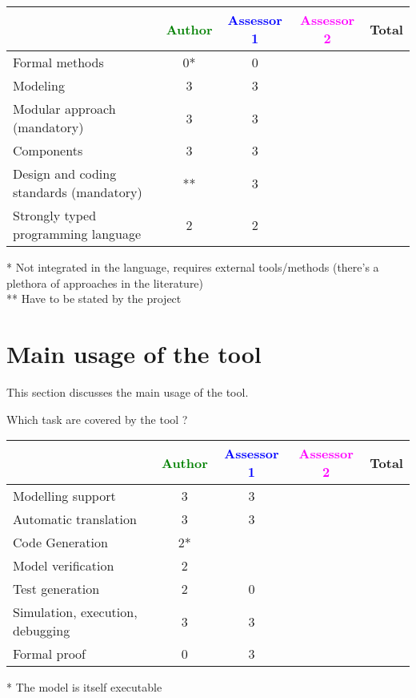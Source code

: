 \begin{tabular}{|l | c | c | c | c|}
\hline
& \textcolor{green}{Author} & \textcolor{blue}{Assessor 1} & \textcolor{magenta}{Assessor 2} & Total \\
\hline
Formal methods &0* &0 & & \\
\hline
Modeling &3 &3 & & \\
\hline
Modular approach (mandatory) &3 &3 & & \\
\hline
Components &3 &3 & & \\
\hline
Design and coding standards (mandatory) &** &3 & & \\
\hline
Strongly typed programming language &2 &2 & & \\
\hline

\end{tabular}

\begin{author_comment}
 * Not integrated in the language, requires external tools/methods (there's a plethora of approaches in the literature)\\
 ** Have to be stated by the project
\end{author_comment}

\section{Main usage of the tool}
\label{main_usage}

This section discusses the main usage of the tool.

Which task are covered by the tool ?


\begin{tabular}{|l | c | c | c | c|}
\hline
& \textcolor{green}{Author} & \textcolor{blue}{Assessor 1} & \textcolor{magenta}{Assessor 2} & Total \\
\hline
Modelling support &3 &3 & & \\
\hline
Automatic translation &3 &3 & & \\
\hline
Code Generation &2* & & & \\
\hline
Model verification &2 & & & \\
\hline
Test generation &2 &0 & & \\
\hline
Simulation, execution, debugging &3 &3 & & \\
\hline
Formal proof &0 &3 & & \\
\hline
\end{tabular}

\begin{author_comment}
 * The model is itself executable
\end{author_comment}

